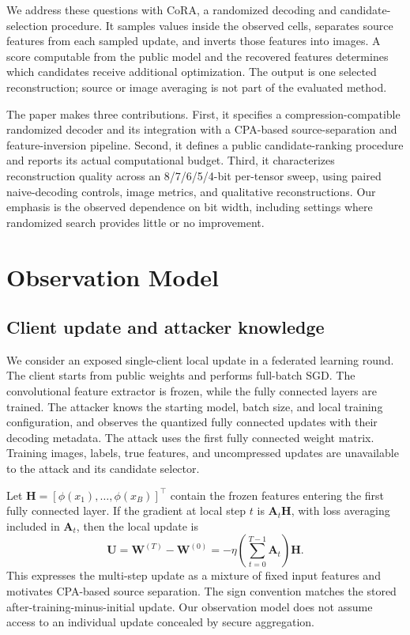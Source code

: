 \documentclass{article}
\newcommand{\U}{\mathbf{U}}
\newcommand{\HH}{\mathbf{H}}
\newcommand{\cora}{CoRA}
\begin{document}
We address these questions with \cora{}, a randomized decoding and
candidate-selection procedure. It samples values inside the observed
cells, separates source features from each sampled update, and inverts
those features into images. A score computable from the public model and
the recovered features determines which candidates receive additional
optimization. The output is one selected reconstruction; source or image
averaging is not part of the evaluated method.

The paper makes three contributions. First, it specifies a
compression-compatible randomized decoder and its integration with a
CPA-based source-separation and feature-inversion pipeline. Second, it
defines a public candidate-ranking procedure and reports its actual
computational budget. Third, it characterizes reconstruction quality
across an 8/7/6/5/4-bit per-tensor sweep, using paired naive-decoding
controls, image metrics, and qualitative reconstructions. Our emphasis
is the observed dependence on bit width, including settings where
randomized search provides little or no improvement.

\section{Observation Model}
\label{sec:observation}
\subsection{Client update and attacker knowledge}
We consider an exposed single-client local update in a federated learning
round. The client starts from public weights and performs full-batch SGD.
The convolutional feature extractor is frozen, while the fully connected
layers are trained. The attacker knows the starting model, batch size,
and local training configuration, and observes the quantized fully
connected updates with their decoding metadata. The attack uses the
first fully connected weight matrix. Training images, labels, true
features, and uncompressed updates are unavailable to the attack and its
candidate selector.

Let $\HH=[\phi(x_1),\ldots,\phi(x_B)]^\top$ contain the frozen features
entering the first fully connected layer. If the gradient at local step
$t$ is $\mathbf{A}_t\HH$, with loss averaging included in
$\mathbf{A}_t$, then the local update is
\begin{equation}
 \U=\mathbf{W}^{(T)}-\mathbf{W}^{(0)}
     =-\eta\left(\sum_{t=0}^{T-1}\mathbf{A}_t\right)\HH.
 \label{eq:mixture}
\end{equation}
This expresses the multi-step update as a mixture of fixed input
features and motivates CPA-based source separation. The sign convention
matches the stored after-training-minus-initial update. Our observation
model does not assume access to an individual update concealed by secure
aggregation.
\end{document}
